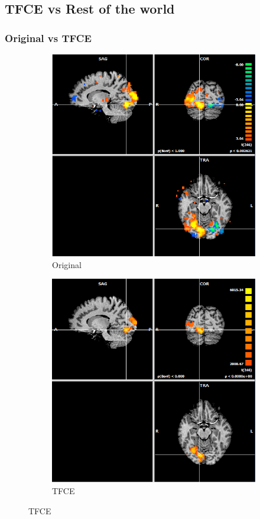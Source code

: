 \documentclass{beamer}
\begin{document}
\subsection{TFCE vs Rest of the world}
\begin{frame}
\frametitle{Original vs TFCE}
\begin{figure}
    \centering
    \begin{subfigure}[b]{0.48\textwidth}
	    \includegraphics[width=\textwidth]{Images/Brainvoyager83187129.png}
	    \caption{Original}
    \end{subfigure}
    \begin{subfigure}[b]{0.48\textwidth}
	    \includegraphics[width=\textwidth]{Images/Brainvoyager-TFCE83187129.png}
	    \caption{TFCE}
    \end{subfigure}
\end{figure}
\end{frame}
\end{document}
